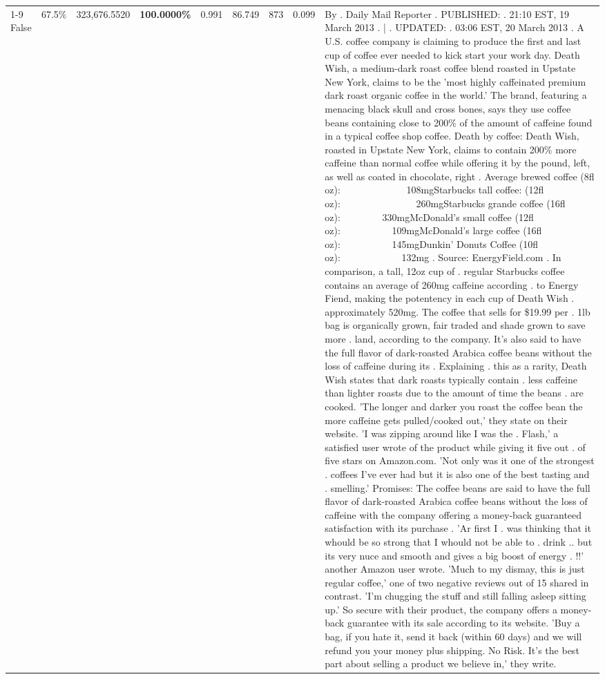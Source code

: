 \begin{table}[H]
{\begin{tabular}{lllrlllll}
\cline{1-9} \cline{2-9}
False & 67.5\% & 323,676.5520 & \bfseries \color{red} 100.0000\% & 0.991 & 86.749 & 873 & 0.099 & By . Daily Mail Reporter . PUBLISHED: . 21:10 EST, 19 March 2013 . | . UPDATED: . 03:06 EST, 20 March 2013 . A U.S. coffee company is claiming to produce the first and last cup of coffee ever needed to kick start your work day. Death Wish, a medium-dark roast coffee blend roasted in Upstate New York, claims to be the 'most highly caffeinated premium dark roast organic coffee in the world.' The brand, featuring a menacing black skull and cross bones, says they use coffee beans containing close to 200\% of the amount of caffeine found in a typical coffee shop coffee. Death by coffee: Death Wish, roasted in Upstate New York, claims to contain 200\% more caffeine than normal coffee while offering it by the pound, left, as well as coated in chocolate, right . Average brewed coffee (8fl oz):              108mgStarbucks tall coffee: (12fl oz):                260mgStarbucks grande coffee (16fl oz):         330mgMcDonald's small coffee (12fl oz):           109mgMcDonald's large coffee (16fl oz):           145mgDunkin' Donuts Coffee (10fl oz):             132mg . Source: EnergyField.com . In comparison, a tall, 12oz cup of . regular Starbucks coffee contains an average of 260mg caffeine according . to Energy Fiend, making the potentency in each cup of Death Wish . approximately 520mg. The coffee that sells for \$19.99 per . 1lb bag is organically grown, fair traded and shade grown to save more . land, according to the company. It's also said to have the full flavor of dark-roasted Arabica coffee beans without the loss of caffeine during its . Explaining . this as a rarity, Death Wish states that dark roasts typically contain . less caffeine than lighter roasts due to the amount of time the beans . are cooked. 'The longer and darker you roast the coffee bean the more caffeine gets pulled/cooked out,' they state on their website. 'I was zipping around like I was the . Flash,' a satisfied user wrote of the product while giving it five out . of five stars on Amazon.com. 'Not only was it one of the strongest . coffees I've ever had but it is also one of the best tasting and . smelling.’ Promises: The coffee beans are said to have the full flavor of dark-roasted Arabica coffee beans without the loss of caffeine with the company offering a money-back guaranteed satisfaction with its purchase . 'Ar first I . was thinking that it whould be so strong that I whould not be able to . drink .. but its very nuce and smooth and gives a big boost of energy . !!' another Amazon user wrote. 'Much to my dismay, this is just regular coffee,' one of two negative reviews out of 15 shared in contrast. 'I'm chugging the stuff and still falling asleep sitting up.' So secure with their product, the company offers a money-back guarantee with its sale according to its website. 'Buy a bag, if you hate it, send it back (within 60 days) and we will refund you your money plus shipping. No Risk. It’s the best part about selling a product we believe in,' they write.‪ \\

\end{tabular}}
\end{table}
